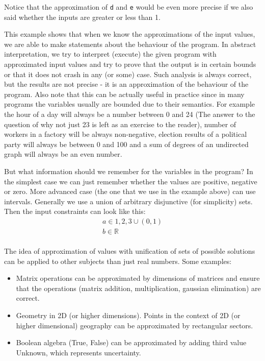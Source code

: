 Notice that the approximation of \verb|d| and \verb|e| would be even more precise if we also said whether the inputs
are greater or less than 1.

This example shows that when we know the approximations of the input values, we are able to make statements about the
behaviour of the program.
In abstract interpretation, we try to interpret (execute) the given program with approximated input values and try to
prove that the output is in certain bounds or that it does not crash in any (or some) case.
Such analysis is always correct, but the results are not precise - it is an approximation of the behaviour of the program.
Also note that this can be actually useful in practice since in many programs the variables usually are bounded due to
their semantics.
For example the hour of a day will always be a number between 0 and 24 (The answer to the question of why not just 23 is
left as an exercise to the reader),
number of workers in a factory will be always non-negative, election results of a political party will always be
between 0 and 100 and a sum of degrees of an undirected graph will always be an even number.

But what information should we remember for the variables in the program?
In the simplest case we can just remember whether the values are positive, negative or zero.
More advanced case (the one that we use in the example above) can use intervals.
Generally we use a union of arbitrary disjunctive (for simplicity) sets.
Then the input constraints can look like this:
\begin{gather*}
    a \in {1, 2, 3} \cup (0, 1)\\
    b \in \mathbb{R}\\
\end{gather*}

The idea of approximation of values with unification of sets of possible solutions can be applied to other subjects than
just real numbers.
Some examples:
\begin{itemize}
    \item Matrix operations can be approximated by dimensions of matrices and ensure that the operations
    (matrix addition, multiplication, gaussian elimination) are correct.

    \item Geometry in 2D (or higher dimensions).
     Points in the context of 2D (or higher dimensional) geography can be approximated by rectangular sectors.

    \item Boolean algebra (True, False) can be approximated by adding third value Unknown, which represents uncertainty.

\end{itemize}

